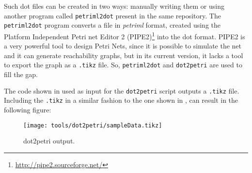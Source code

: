 Such dot files can be created in two ways: manually writing them or using
another program called \verb|petriml2dot| present in the same repository. The
\verb|petriml2dot| program converts a file in \emph{petriml} format, created using the Platform Independent Petri
net Editor 2 (PIPE2)\footnote{\url{http://pipe2.sourceforge.net/}} into the dot
format.
PIPE2 is a very powerful tool to design Petri Nets, since it is possible to simulate the
net and it can generate reachability graphs, but in its current version, it
lacks a tool to export the graph as a \verb|.tikz| file. So,
\verb|petriml2dot| and \verb|dot2petri| are used to fill the gap.

The code shown in  used as input for the
\verb|dot2petri| script outputs a \verb|.tikz| file. Including the \verb|.tikz| in a similar fashion
to the one shown in , can result in the following figure:
\begin{figure}[H]
  \centering
  \texttt{[image: tools/dot2petri/sampleData.tikz]}
  \caption{dot2petri output.}
  \label{fig:Dot2automataSampleOutput}
\end{figure}



